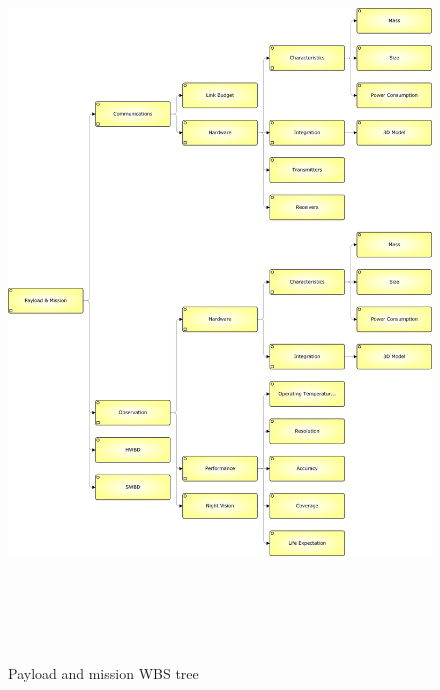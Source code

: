 \documentclass[a4paper]{report}
\begin{document}
\begin{figure}
\label{fig:WBSPM}
\centering
\includegraphics[height=20cm]{Figures/WBS_PM.png}

\caption{Payload and mission WBS tree}
\end{figure}
\end{document}
